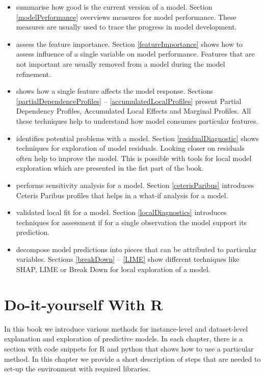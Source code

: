 \documentclass[12pt,]{krantz}
\providecommand{\tightlist}{%
  \setlength{\itemsep}{0pt}\setlength{\parskip}{0pt}}
\begin{document}
\begin{itemize}
\tightlist
\item
  summarise how good is the current version of a model. Section \ref{modelPerformance} overviews measures for model performance. These measures are usually used to trace the progress in model development.
\item
  assess the feature importance. Section \ref{featureImportance} shows how to assess influence of a single variable on model performance. Features that are not important are usually removed from a model during the model refinement.
\item
  shows how a single feature affects the model response. Sections \ref{partialDependenceProfiles} -- \ref{accumulatedLocalProfiles} present Partial Dependency Profiles, Accumulated Local Effects and Marginal Profiles. All these techniques help to understand how model consumes particular features.
\item
  identifies potential problems with a model. Section \ref{residualDiagnostic} shows techniques for exploration of model residuals. Looking closer on residuals often help to improve the model. This is possible with tools for local model exploration which are presented in the fist part of the book.
\item
  performs sensitivity analysis for a model. Section \ref{ceterisParibus} introduces Ceteris Paribus profiles that helps in a what-if analysis for a model.
\item
  validated local fit for a model. Section \ref{localDiagnostics} introduces techniques for assessment if for a single observation the model support its prediction.
\item
  decompose model predictions into pieces that can be attributed to particular variables. Sections \ref{breakDown} -- \ref{LIME} show different techniques like SHAP, LIME or Break Down for local exploration of a model.
\end{itemize}

\hypertarget{doItYourselfWithR}{%
\section{Do-it-yourself With R}\label{doItYourselfWithR}}

In this book we introduce various methods for instance-level and dataset-level explanation and exploration of predictive models. In each chapter, there is a section with code snippets for R and python that shows how to use a particular method. In this chapter we provide a short description of steps that are needed to set-up the environment with required libraries.
\end{document}
